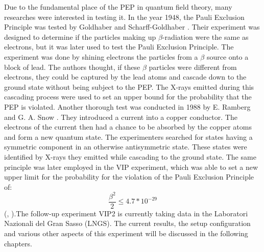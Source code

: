 Due to the fundamental place of the PEP in quantum field theory, many researches were interested in testing it. In the year 1948, the Pauli Exclusion Principle was tested by Goldhaber and Scharff-Goldhaber \cite{Goldhaber1948}. Their experiment was designed to determine if the particles making up $\beta$-radiation were the same as electrons, but it was later used to test the Pauli Exclusion Principle. The experiment was done by shining electrons the particles from a $\beta$ source onto a block of lead. The authors thought, if these $\beta$ particles were different from electrons, they could be captured by the lead atoms and cascade down to the ground state without being subject to the PEP. The X-rays emitted during this cascading process were used to set an upper bound for the probability that the PEP is violated. Another thorough test was conducted in 1988 by E. Ramberg and G. A. Snow \cite{RAMBERG1990}. They introduced a current into a copper conductor. The electrons of the current then had a chance to be absorbed by the copper atoms and form a new quantum state. The experimenters searched for states having a symmetric component in an otherwise antisymmetric state. These states were identified by X-rays they emitted while cascading to the ground state. The same principle was later employed in the VIP experiment, which was able to set a new upper limit for the probability for the violation of the Pauli Exclusion Principle of:%
%
\begin{equation*}
\frac{\beta^{2}}{2} \leq 4.7 * 10^{-29}                                                                                                                                                                                                                                                                                                                                                                                                                                                                                                                                                                                                                                                                                                                                                                                                                                                                                                                                                                                                                                                                                                                                                                                                                                                                                                                                                                                                                                                                                                      \end{equation*}
%
(\cite{Curceanu2012}, \cite{Curceanu2011}).The follow-up experiment VIP2 is currently taking data in the Laboratori Nazionali del Gran Sasso (LNGS). The current results, the setup configuration and various other aspects of this experiment will be discussed in the following chapters.